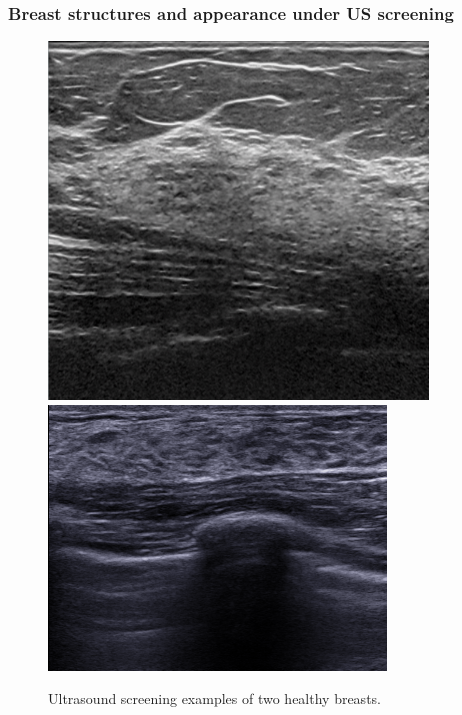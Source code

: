 \begin{frame}\frametitle{Breast structures and appearance under US screening}
  \centering
		\begin{figure}
		\includegraphics[height=.50\textheight]{sa1.png}~
		\includegraphics[height=.50\textheight]{sa2.png}
		\caption{ Ultrasound screening examples of two healthy breasts.}
		\end{figure}	
\end{frame}

